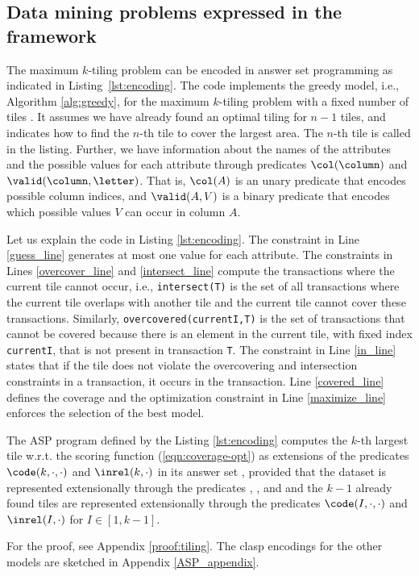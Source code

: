 \subsection{Data mining problems expressed in the framework} 

The maximum $k$-tiling problem can be encoded in answer set programming as indicated in Listing~\ref{lst:encoding}. The code implements the greedy model, i.e., Algorithm \ref{alg:greedy}, for the maximum $k$-tiling problem with a fixed number of tiles \parencite{tiling}. It assumes we have already found an optimal tiling for $n-1$ tiles, and indicates how to find the $n$-th tile to cover the largest area. The $n$-th tile is called \guess in the listing. \changesb Further, we have information about the names of the attributes and the possible values for each attribute through predicates $\col(\column)$ and $\valid(\column, \letter)$. That is, $\col(A)$ is an unary predicate that encodes possible column indices, and $\valid(A,V)$ is a binary predicate that encodes which possible values $V$ can occur in column $A$. \changese

Let us explain the code in Listing \ref{lst:encoding}. The constraint in Line \ref{guess_line} generates at most one value for each attribute. The constraints in Lines \ref{overcover_line} and \ref{intersect_line} compute the transactions where the current tile cannot occur, i.e., \texttt{intersect(T)} is the set of all transactions where the current tile overlaps with another tile and the current tile cannot cover these transactions. Similarly, \texttt{overcovered(currentI,T)} is the set of transactions that cannot be covered because there is an element in the current tile, with fixed index \texttt{currentI}, that is not present in transaction \texttt{T}. The constraint in Line \ref{in_line} states that if the tile does not violate the overcovering and intersection constraints in a transaction, it occurs in the transaction. Line \ref{covered_line} defines the coverage and the optimization constraint in Line \ref{maximize_line} enforces the selection of the best model.

\begin{theorem}\label{theorem:tiling}
 The ASP program \pprog defined by the Listing \ref{lst:encoding} computes the $k$-th largest tile w.r.t. the scoring function \maxcover (\ref{eqn:coverage-opt}) as extensions of the predicates $\code(k,\cdot,\cdot)$ and $\inrel(k,\cdot)$ in its answer set \as, provided that 
the dataset is represented extensionally through the predicates \db, \valid, and \col 
and the $k-1$ already found tiles are represented extensionally through the predicates $\code(I,\cdot,\cdot)$ and $\inrel(I,\cdot)$ for $I \in [1,k-1]$.
\end{theorem}
For the proof, see Appendix \ref{proof:tiling}.
The clasp encodings for the other models are sketched in Appendix \ref{ASP_appendix}.

